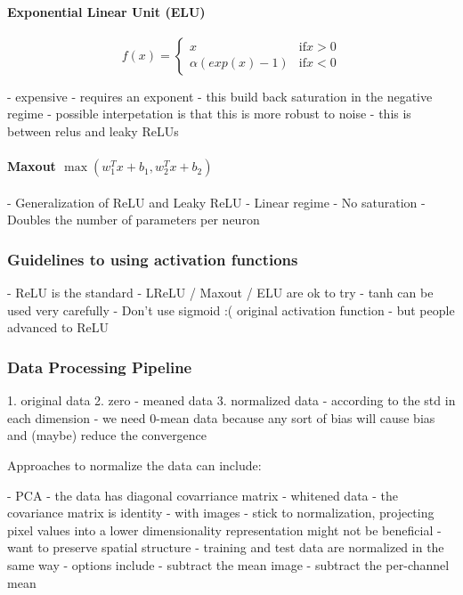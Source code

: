 \paragraph{Exponential Linear Unit (ELU)}

$$ f(x) = \begin{cases} x & \text{if} x > 0 \\ \alpha(exp(x)-1) & \text{if} x < 0 \end{cases}  $$ 

- expensive - requires an exponent
- this build back saturation in the negative regime 
- possible interpetation is that this is more robust to noise
- this is between relus and leaky ReLUs

\paragraph{Maxout $\max(w_1^Tx + b_1, w_2^T x + b_2)$}

- Generalization of ReLU and Leaky ReLU
- Linear regime 
- No saturation
- Doubles the number of parameters per neuron

\subsubsection{Guidelines to using activation functions }

- ReLU is the standard
- LReLU / Maxout / ELU are ok to try
- tanh can be used very carefully
- Don't use sigmoid :( original activation function - but people advanced to ReLU

\subsubsection{Data Processing Pipeline}

1. original data
2. zero - meaned data
3. normalized data - according to the std in each dimension
   - we need 0-mean data because any sort of bias will cause bias and (maybe) reduce the convergence

Approaches to normalize the data can include:

	- PCA - the data has diagonal covarriance matrix 
	- whitened data - the covariance matrix is identity
	- with images - stick to normalization, projecting pixel values into a lower dimensionality representation might not be beneficial
	- want to preserve spatial structure
	- training and test data are normalized in the same way
	- options include - subtract the mean image
	- subtract the per-channel mean

